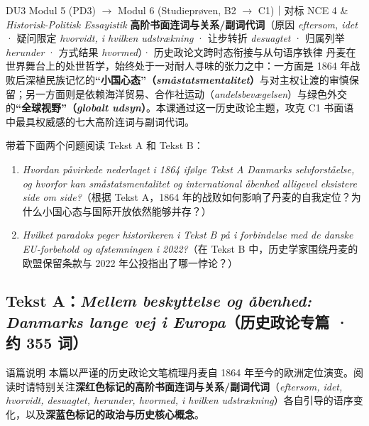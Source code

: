 {DU3 Modul 5 (PD3) $\rightarrow$ Modul 6 (Studieprøven, B2 $\rightarrow$ C1)｜对标 NCE 4 \& \textit{Historisk-Politisk Essayistik}}
{\textbf{高阶书面连词与关系/副词代词}（原因 \textit{eftersom, idet} · 疑问限定 \textit{hvorvidt, i hvilken udstrækning} · 让步转折 \textit{desuagtet} · 归属列举 \textit{herunder} · 方式结果 \textit{hvormed}）· 历史政论文跨时态衔接与从句语序铁律}
{丹麦在世界舞台上的处世哲学，始终处于一对耐人寻味的张力之中：一方面是 1864 年战败后深植民族记忆的\textbf{“小国心态”（\textit{småstatsmentalitet}）}与对主权让渡的审慎保留；另一方面则是依赖海洋贸易、合作社运动（\textit{andelsbevægelsen}）与绿色外交的\textbf{“全球视野”（\textit{globalt udsyn}）}。本课通过这一历史政论主题，攻克 C1 书面语中最具权威感的七大高阶连词与副词代词。}

\begin{foerduleaeser}
带着下面两个问题阅读 Tekst A 和 Tekst B：
\begin{enumerate}
  \item \textit{Hvordan påvirkede nederlaget i 1864 ifølge Tekst A Danmarks selvforståelse, og hvorfor kan småstatsmentalitet og international åbenhed alligevel eksistere side om side?}（根据 Tekst A，1864 年的战败如何影响了丹麦的自我定位？为什么小国心态与国际开放依然能够并存？）
  \item \textit{Hvilket paradoks peger historikeren i Tekst B på i forbindelse med de danske EU-forbehold og afstemningen i 2022?}（在 Tekst B 中，历史学家围绕丹麦的欧盟保留条款与 2022 年公投指出了哪一悖论？）
\end{enumerate}
\end{foerduleaeser}


\subsection*{Tekst A：\textit{Mellem beskyttelse og åbenhed: Danmarks lange vej i Europa}（历史政论专篇 · 约 355 词）}

\begin{tipbox}{语篇说明}
本篇以严谨的历史政论文笔梳理丹麦自 1864 年至今的欧洲定位演变。阅读时请特别关注\textbf{\color{NCDRed}深红色标记的高阶书面连词与关系/副词代词}（\textit{eftersom, idet, hvorvidt, desuagtet, herunder, hvormed, i hvilken udstrækning}）各自引导的语序变化，以及\textbf{\color{NCDNavy}深蓝色标记的政治与历史核心概念}。
\end{tipbox}

